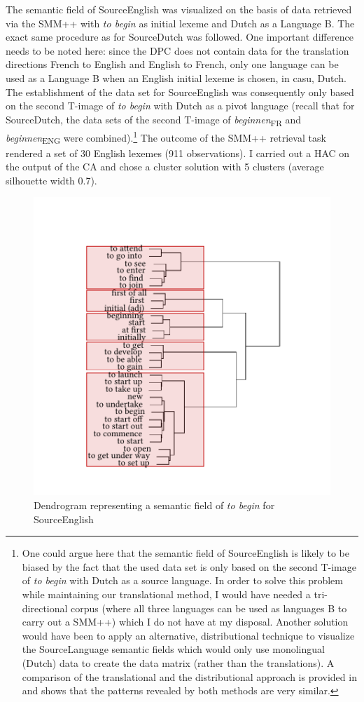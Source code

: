 The semantic field of SourceEnglish was visualized on the basis of data retrieved via the SMM++ with \textit{to begin} as initial lexeme and Dutch as a Language B. The exact same procedure as for SourceDutch was followed. One important difference needs to be noted here: since the DPC does not contain data for the translation directions French to English and English to French, only one language can be used as a Language B when an English initial lexeme is chosen, in casu, Dutch. The establishment of the data set for SourceEnglish was consequently only based on the second T-image of \textit{to begin} with Dutch as a pivot language (recall that for SourceDutch, the data sets of the second T-image of \textit{beginnen}\textsubscript{FR} and \textit{beginnen}\textsubscript{ENG} were combined).\footnote{One could argue here that the semantic field of SourceEnglish is likely to be biased by the fact that the used data set is only based on the second T-image of \textit{to begin} with Dutch as a source language. In order to solve this problem while maintaining our translational method, I would have needed a tri-directional corpus (where all three languages can be used as languages B to carry out a SMM++) which I do not have at my disposal. Another solution would have been to apply an alternative, distributional technique to visualize the SourceLanguage semantic fields which would only use monolingual (Dutch) data to create the data matrix (rather than the translations). A comparison of the translational and the distributional approach is provided in \citet{vandevoorde_distributional_2016} and shows that the patterns revealed by both methods are very similar.} The outcome of the SMM++ retrieval task rendered a set of 30 English lexemes (911 observations). I carried out a HAC on the output of the CA and chose a cluster solution with 5 clusters (average silhouette width 0.7).

\begin{figure}
\includegraphics[width=.75\textwidth,trim=0 20 0 50]{figures/tree90.pdf}
\caption{\label{fig:4:87}Dendrogram representing a semantic field of \textit{to begin} for SourceEnglish}
\end{figure}

